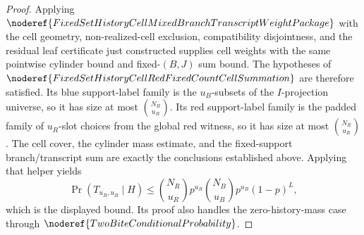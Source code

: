 \begin{proof}
Applying
\(\noderef{FixedSetHistoryCellMixedBranchTranscriptWeightPackage}\) with the
cell geometry, non-realized-cell exclusion, compatibility disjointness, and
the residual leaf certificate just constructed supplies cell weights with the
same pointwise cylinder bound and fixed-\((B,J)\) sum bound.  The hypotheses of
\(\noderef{FixedSetHistoryCellRedFixedCountCellSummation}\) are therefore
satisfied.  Its blue support-label family is the \(u_B\)-subsets of the
\(I\)-projection universe, so it has size at most \(\binom{N_B}{u_B}\).  Its
red support-label family is the padded family of \(u_R\)-slot choices from
the global red witness, so it has size at most \(\binom{N_R}{u_R}\).  The
cell cover, the cylinder mass estimate, and the fixed-support
branch/transcript sum are exactly the conclusions established above.
Applying that helper yields
\[
\Pr(T_{u_R,u_B}\mid H)\le
\binom{N_R}{u_R}p^{u_R}\binom{N_B}{u_B}p^{u_B}(1-p)^L,
\]
which is the displayed bound.  Its proof also handles the zero-history-mass
case through \(\noderef{TwoBiteConditionalProbability}\).
\end{proof}
